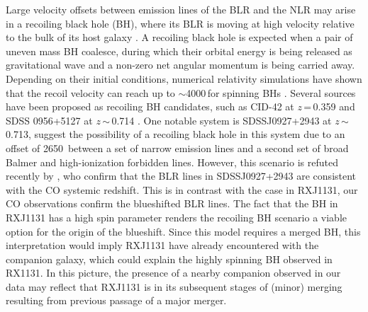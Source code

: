 \documentclass[]{emulateapj}
\begin{document}
Large velocity offsets between emission lines of the
BLR and the NLR may arise in a recoiling black hole (BH),
where its BLR is moving at high velocity relative to the bulk of its host galaxy 
\citep{Madau04a, Bonning07a, Loeb07a}.
A recoiling black hole is expected 
when a pair of uneven mass BH coalesce, during which their orbital energy is being released 
as gravitational wave and a 
non-zero net angular momentum is being carried away.
Depending on their initial conditions, numerical relativity simulations have shown that
the recoil velocity can reach up to $\sim$4000\,\kms for spinning BHs \citep[\eg][]{Campanelli07a}.
Several sources have been proposed as recoiling BH candidates, such as CID-42 at $z$\,=\,0.359 \citep{Civano10a} and
SDSS 0956+5127 at $z$\,$\sim$\,0.714 \citep{Steinhardt12a}.
One notable system is SDSSJ0927+2943 at $z$\,$\sim$\,0.713, \citet{Komossa08a} 
suggest the possibility of a recoiling black hole in this system due to an offset of 2650\,\kms 
between a set of narrow emission lines and a second set of broad Balmer 
and high-ionization forbidden lines.  %
However, this scenario is refuted recently by \citet{Decarli14a}, who confirm that the
BLR lines in SDSSJ0927+2943 are consistent with the CO systemic redshift.
This is in contrast with the case in RXJ1131, our CO observations confirm the blueshifted BLR lines.
The fact that the BH in RXJ1131 has a high spin parameter \citep{Reis14a}
renders the recoiling BH scenario a viable option for the origin of the blueshift. 
Since this model requires a merged BH, this interpretation would imply RXJ1131 have 
already encountered with the companion galaxy, which could explain
the highly spinning BH observed in RX1131.
In this picture, the presence of a nearby companion observed in our data may reflect that RXJ1131 is in its 
subsequent stages of (minor) merging resulting from previous passage of a major merger.
\end{document}

